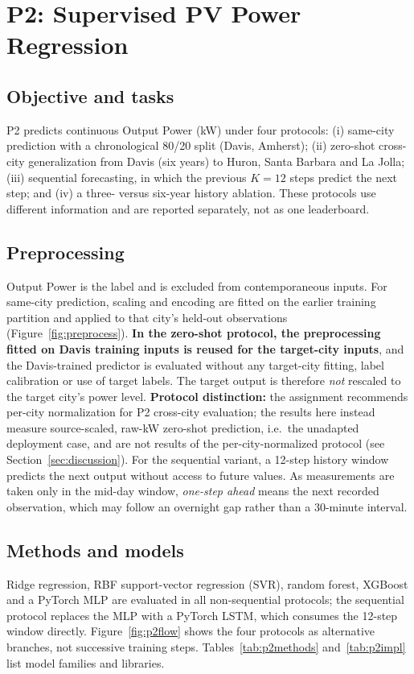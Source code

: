 \documentclass[11pt,letterpaper]{article}
\begin{document}
\section{P2: Supervised PV Power Regression}\label{sec:p2}

\subsection{Objective and tasks}
P2 predicts continuous Output Power (kW) under four protocols: (i) same-city prediction with a
chronological 80/20 split (Davis, Amherst); (ii) zero-shot cross-city generalization from Davis
(six years) to Huron, Santa Barbara and La Jolla; (iii) sequential forecasting, in which the
previous $K=12$ steps predict the next step; and (iv) a three- versus six-year history ablation.
These protocols use different information and are reported separately, not as one leaderboard.

\subsection{Preprocessing}
Output Power is the label and is excluded from contemporaneous inputs. For same-city prediction,
scaling and encoding are fitted on the earlier training partition and applied to that city's
held-out observations (Figure~\ref{fig:preprocess}). \textbf{In the zero-shot protocol, the
preprocessing fitted on Davis training inputs is reused for the target-city inputs}, and the
Davis-trained predictor is evaluated without any target-city fitting, label calibration or use of
target labels. The target output is therefore \emph{not} rescaled to the target city's power
level. \textbf{Protocol distinction:} the assignment recommends per-city normalization for P2
cross-city evaluation; the results here instead measure source-scaled, raw-kW zero-shot
prediction, i.e.\ the unadapted deployment case, and are not results of the per-city-normalized
protocol (see Section~\ref{sec:discussion}). For the sequential variant, a 12-step history
window predicts the next output without access to future values. As measurements are taken
only in the mid-day window, \emph{one-step ahead} means the next recorded observation, which
may follow an overnight gap rather than a 30-minute interval.

\subsection{Methods and models}
Ridge regression, RBF support-vector regression (SVR), random forest, XGBoost and a PyTorch MLP
are evaluated in all non-sequential protocols; the sequential protocol replaces the MLP with a
PyTorch LSTM, which consumes the 12-step window directly. Figure~\ref{fig:p2flow} shows the four
protocols as alternative branches, not successive training steps. Tables~\ref{tab:p2methods}
and~\ref{tab:p2impl} list model families and libraries.


\end{document}
